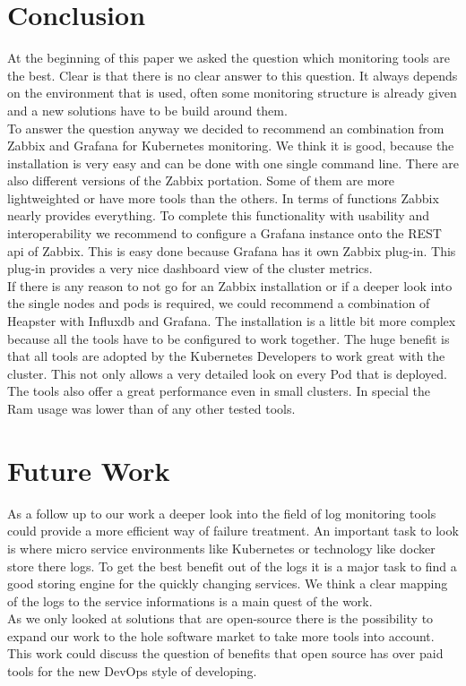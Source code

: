 \section{Conclusion}
At the beginning of this paper we asked the question which monitoring tools are the best. Clear is that there is no clear answer to this question. It always depends on the environment that is used, often some monitoring structure is already given and a new solutions have to be build around them.\\
To answer the question anyway we decided to recommend an combination from Zabbix and Grafana for Kubernetes monitoring. We think it is good, because the installation is very easy and can be done with one single command line. There are also different versions of the Zabbix portation. Some of them are more lightweighted or have more tools than the others. In terms of functions Zabbix nearly provides everything. To complete this functionality with usability and interoperability we recommend to configure a Grafana instance onto the REST api of Zabbix. This is easy done because Grafana has it own Zabbix plug-in. This plug-in provides a very nice dashboard view of the cluster metrics.
\\
If there is any reason to not go for an Zabbix installation or if a deeper look into the single nodes and pods is required, we could recommend a combination of Heapster with Influxdb and Grafana. The installation is a little bit more complex because all the tools have to be configured to work together. The huge benefit is that all tools are adopted by the Kubernetes Developers to work great with the cluster. This not only allows a very detailed look on every Pod that is deployed. The tools also offer a great performance even in small clusters. In special the Ram usage was lower than of any other tested tools.

\section*{Future Work}
As a follow up to our work a deeper look into the field of log monitoring tools could provide a more efficient way of failure treatment. An important task to look is where micro service environments like Kubernetes or technology like docker store there logs. To get the best benefit out of the logs it is a major task to find a good storing engine for the quickly changing services. We think a clear mapping of the logs to the service informations is a main quest of the work.\\
As we only looked at solutions that are open-source there is the possibility to expand our work to the hole software market to take more tools into account. This work could discuss the question of benefits that open source has over paid tools for the new DevOps style of developing.

